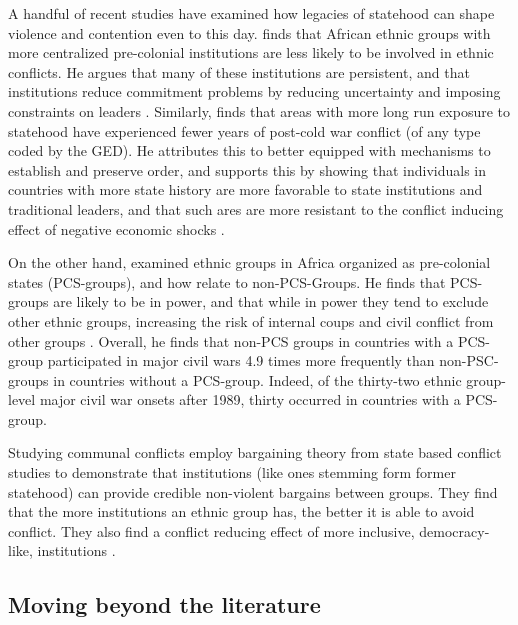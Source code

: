 \documentclass[12pt]{article}
\begin{document}
A handful of recent studies have examined how legacies of statehood can shape
violence and contention even to this day. \citet{Wig2016} finds that African
ethnic groups with more centralized pre-colonial institutions are less likely to
be involved in ethnic conflicts. He argues that many of these institutions are
persistent, and that institutions reduce commitment problems by reducing
uncertainty and imposing constraints on leaders \citep{Wig2016}. Similarly,
\citet{Depetris-Chauvin2016} finds that areas with more long run exposure to
statehood have experienced fewer years of post-cold war conflict (of any type
coded by the GED). He attributes this to better equipped with mechanisms to
establish and preserve order, and supports this by showing that individuals in
countries with more state history are more favorable to state institutions and
traditional leaders, and that such ares are more resistant to the conflict
inducing effect of negative economic shocks \citep{Depetris-Chauvin2016}.

On the other hand, \citet{Paine2019} examined ethnic groups in Africa organized
as pre-colonial states (PCS-groups), and how relate to non-PCS-Groups. He finds
that PCS-groups are likely to be in power, and that while in power they tend to
exclude other ethnic groups, increasing the risk of internal coups and civil
conflict from other groups \citep{Paine2019}. Overall, he finds that non-PCS
groups in countries with a PCS-group participated in major civil wars 4.9 times
more frequently than non-PSC-groups in countries without a PCS-group. Indeed, of
the thirty-two ethnic group-level major civil war onsets after 1989, thirty
occurred in countries with a PCS-group.

Studying communal conflicts \citet{Wig2018} employ bargaining theory from state
based conflict studies to demonstrate that institutions (like ones stemming form
former statehood) can provide credible non-violent bargains between groups. They
find that the more institutions an ethnic group has, the better it is able to
avoid conflict. They also find a conflict reducing effect of more inclusive,
democracy-like, institutions \citep{Wig2018}.

\subsection{Moving beyond the literature} \label{Moving beyond}

\end{document}
